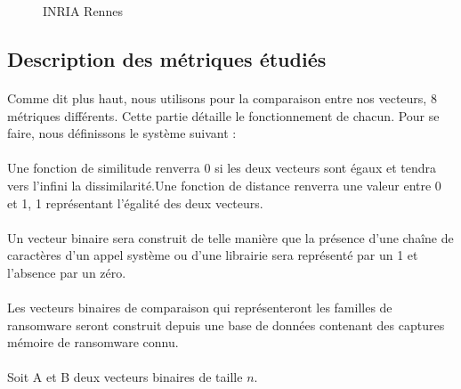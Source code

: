 \documentclass[a4paper, 12pt, twoside]{article}
\begin{document}
\begin{figure}[h]
  \caption{INRIA Rennes}
\end{figure}


\subsection{Description des métriques étudiés}

\paragraph{}
Comme dit plus haut, nous utilisons pour la comparaison entre nos vecteurs, 8 métriques différents. Cette partie détaille le fonctionnement de chacun. Pour se faire, nous définissons le système suivant :

\paragraph{}
Une fonction de similitude renverra 0 si les deux vecteurs sont égaux et tendra vers l'infini la dissimilarité.Une fonction de distance renverra une valeur entre 0 et 1, 1 représentant l'égalité des deux vecteurs.
\paragraph{}
Un vecteur binaire sera construit de telle manière que la présence d'une chaîne de caractères d'un appel système ou d'une librairie sera représenté par un 1 et l'absence par un zéro.
\paragraph{}
Les vecteurs binaires de comparaison qui représenteront les familles de ransomware seront construit depuis une base de données contenant des captures mémoire de ransomware connu.
\paragraph{}
Soit A et B deux vecteurs binaires de taille $n$.
\end{document}
